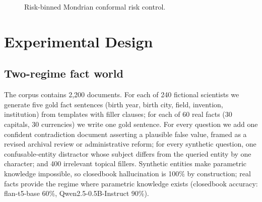 \documentclass[11pt]{article}
\begin{document}
\begin{figure}[tbp]
\centering
{}
\caption{Risk-binned Mondrian conformal risk control.}
\label{alg:rb}
\end{figure}

\section{Experimental Design}\label{sec:design}

\subsection{Two-regime fact world}
The corpus contains 2{,}200 documents. For each of 240 fictional
scientists we generate five gold fact sentences (birth year, birth
city, field, invention, institution) from templates with filler
clauses; for each of 60 real facts (30 capitals, 30 currencies) we
write one gold sentence. For every question we add one confident
contradiction document asserting a plausible false value, framed as a
revised archival review or administrative reform; for every synthetic
question, one confusable-entity distractor whose subject differs from
the queried entity by one character; and 400 irrelevant topical
fillers. Synthetic entities make parametric knowledge impossible, so
closedbook hallucination is 100\% by construction; real facts provide
the regime where parametric knowledge exists (closedbook accuracy:
flan-t5-base 60\%, Qwen2.5-0.5B-Instruct 90\%).
\end{document}
